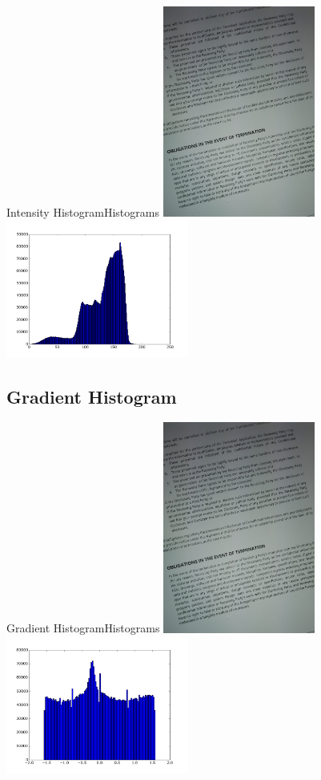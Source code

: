\documentclass{beamer}
\begin{document}
\begin{frame}{Intensity Histogram}{Histograms}
\centering
    \includegraphics[width=50mm]{./Image1.jpg}\includegraphics[width=60mm]{./intensity_histogram.png}
       
\end{frame}

\subsection{Gradient Histogram}
\begin{frame}{Gradient Histogram}{Histograms}
\centering
    \includegraphics[width=50mm]{./Image1.jpg}\includegraphics[width=60mm]{./hist.png}

\end{frame}
\end{document}
